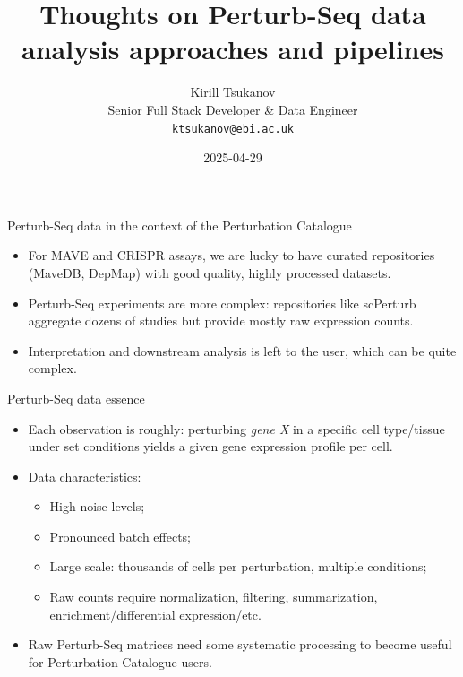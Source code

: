 \documentclass[handout]{beamer}
\title{Thoughts on Perturb-Seq data analysis approaches and pipelines}
\date{2025-04-29}
\author{Kirill Tsukanov \\ Senior Full Stack Developer \& Data Engineer \\ \texttt{ktsukanov@ebi.ac.uk}}
\institute{Perturbation Catalogue WP1/2/3 Technical Meeting}
\begin{document}
\begin{frame}
    \titlepage
\end{frame}

\begin{frame}{Perturb-Seq data in the context of the Perturbation Catalogue}
    \begin{itemize}
        \item For MAVE and CRISPR assays, we are lucky to have curated repositories (MaveDB, DepMap) with good quality, highly processed datasets.
        \item Perturb-Seq experiments are more complex: repositories like scPerturb aggregate dozens of studies but provide mostly raw expression counts.
        \item Interpretation and downstream analysis is left to the user, which can be quite complex.
    \end{itemize}
\end{frame}

\begin{frame}{Perturb-Seq data essence}
    \begin{itemize}
        \item Each observation is roughly: perturbing \emph{gene X} in a specific cell type/tissue under set conditions yields a given gene expression profile per cell.
        \item Data characteristics:
        \begin{itemize}
            \item High noise levels;
            \item Pronounced batch effects;
            \item Large scale: thousands of cells per perturbation, multiple conditions;
            \item Raw counts require normalization, filtering, summarization, enrichment/differential expression/etc.
        \end{itemize}
        \item Raw Perturb-Seq matrices need some systematic processing to become useful for Perturbation Catalogue users.
    \end{itemize}
\end{frame}
\end{document}
